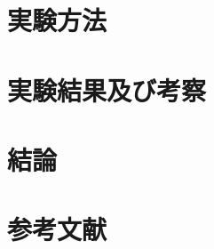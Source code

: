 \documentclass[a4paper,11pt,uplatex]{jsarticle}
\begin{document}
\section{実験方法}


\section{実験結果及び考察}

\section{結論}

\section{参考文献}
\end{document}
